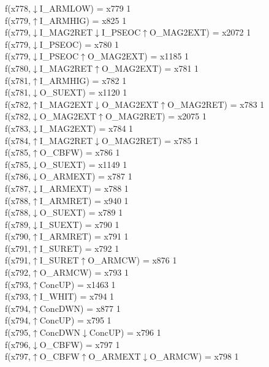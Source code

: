 f(x778,$\downarrow$I\_ARMLOW) = x779 {1} \\
f(x779,$\uparrow$I\_ARMHIG) = x825 {1} \\
f(x779,$\downarrow$I\_MAG2RET$\downarrow$I\_PSEOC$\uparrow$O\_MAG2EXT) = x2072 {1} \\
f(x779,$\downarrow$I\_PSEOC) = x780 {1} \\
f(x779,$\downarrow$I\_PSEOC$\uparrow$O\_MAG2EXT) = x1185 {1} \\
f(x780,$\downarrow$I\_MAG2RET$\uparrow$O\_MAG2EXT) = x781 {1} \\
f(x781,$\uparrow$I\_ARMHIG) = x782 {1} \\
f(x781,$\downarrow$O\_SUEXT) = x1120 {1} \\
f(x782,$\uparrow$I\_MAG2EXT$\downarrow$O\_MAG2EXT$\uparrow$O\_MAG2RET) = x783 {1} \\
f(x782,$\downarrow$O\_MAG2EXT$\uparrow$O\_MAG2RET) = x2075 {1} \\
f(x783,$\downarrow$I\_MAG2EXT) = x784 {1} \\
f(x784,$\uparrow$I\_MAG2RET$\downarrow$O\_MAG2RET) = x785 {1} \\
f(x785,$\uparrow$O\_CBFW) = x786 {1} \\
f(x785,$\downarrow$O\_SUEXT) = x1149 {1} \\
f(x786,$\downarrow$O\_ARMEXT) = x787 {1} \\
f(x787,$\downarrow$I\_ARMEXT) = x788 {1} \\
f(x788,$\uparrow$I\_ARMRET) = x940 {1} \\
f(x788,$\downarrow$O\_SUEXT) = x789 {1} \\
f(x789,$\downarrow$I\_SUEXT) = x790 {1} \\
f(x790,$\uparrow$I\_ARMRET) = x791 {1} \\
f(x791,$\uparrow$I\_SURET) = x792 {1} \\
f(x791,$\uparrow$I\_SURET$\uparrow$O\_ARMCW) = x876 {1} \\
f(x792,$\uparrow$O\_ARMCW) = x793 {1} \\
f(x793,$\uparrow$ConcUP) = x1463 {1} \\
f(x793,$\uparrow$I\_WHIT) = x794 {1} \\
f(x794,$\uparrow$ConcDWN) = x877 {1} \\
f(x794,$\uparrow$ConcUP) = x795 {1} \\
f(x795,$\uparrow$ConcDWN$\downarrow$ConcUP) = x796 {1} \\
f(x796,$\downarrow$O\_CBFW) = x797 {1} \\
f(x797,$\uparrow$O\_CBFW$\uparrow$O\_ARMEXT$\downarrow$O\_ARMCW) = x798 {1} \\
